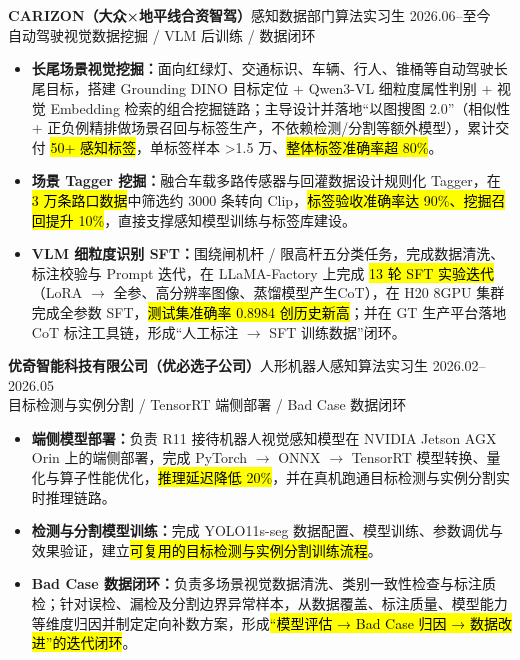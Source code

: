 \section[实习经历]{}
{\small\textbf{CARIZON（大众×地平线合资智驾）}}\quad 感知数据部门算法实习生 \hfill {2026.06--至今}\\
{\scriptsize\color{WHU_Blue} 自动驾驶视觉数据挖掘 / VLM 后训练 / 数据闭环}
\begin{itemize}
    \item \textbf{长尾场景视觉挖掘：}面向红绿灯、交通标识、车辆、行人、锥桶等自动驾驶长尾目标，搭建 Grounding DINO 目标定位 + Qwen3-VL 细粒度属性判别 + 视觉 Embedding 检索的组合挖掘链路；主导设计并落地“以图搜图 2.0”（相似性 + 正负例精排做场景召回与标签生产，不依赖检测/分割等额外模型），累计交付 \hl{50+ 感知标签}，单标签样本 >1.5 万、\hl{整体标签准确率超 80\%}。
    \item \textbf{场景 Tagger 挖掘：}融合车载多路传感器与回灌数据设计规则化 Tagger，在 \hl{3 万条路口数据}中筛选约 3000 条转向 Clip，\hl{标签验收准确率达 90\%、挖掘召回提升 10\%}，直接支撑感知模型训练与标签库建设。
    \item \textbf{VLM 细粒度识别 SFT：}围绕闸机杆 / 限高杆五分类任务，完成数据清洗、标注校验与 Prompt 迭代，在 LLaMA-Factory 上完成 \hl{13 轮 SFT 实验迭代}（LoRA $\rightarrow$ 全参、高分辨率图像、蒸馏模型产生CoT），在 H20 8GPU 集群完成全参数 SFT，\hl{测试集准确率 0.8984 创历史新高}；并在 GT 生产平台落地 CoT 标注工具链，形成“人工标注 $\rightarrow$ SFT 训练数据”闭环。
\end{itemize}

\vspace{0.30em}
{\small\textbf{优奇智能科技有限公司（优必选子公司）}}\quad 人形机器人感知算法实习生 \hfill {2026.02--2026.05} \\
{\scriptsize\color{WHU_Blue} 目标检测与实例分割 / TensorRT 端侧部署 / Bad Case 数据闭环}
\begin{itemize}
    \item \textbf{端侧模型部署：}负责 R11 接待机器人视觉感知模型在 NVIDIA Jetson AGX Orin 上的端侧部署，完成 PyTorch $\rightarrow$ ONNX $\rightarrow$ TensorRT 模型转换、量化与算子性能优化，\hl{推理延迟降低 20\%}，并在真机跑通目标检测与实例分割实时推理链路。
    \item \textbf{检测与分割模型训练：}完成 YOLO11s-seg 数据配置、模型训练、参数调优与效果验证，建立\hl{可复用的目标检测与实例分割训练流程}。
    \item \textbf{Bad Case 数据闭环：}负责多场景视觉数据清洗、类别一致性检查与标注质检；针对误检、漏检及分割边界异常样本，从数据覆盖、标注质量、模型能力等维度归因并制定定向补数方案，形成\hl{“模型评估 → Bad Case 归因 → 数据改进”的迭代闭环}。
\end{itemize}

